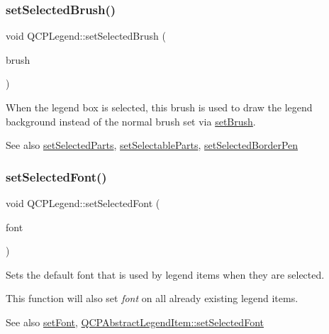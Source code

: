\subsubsection{\texorpdfstring{setSelectedBrush()}{setSelectedBrush()}}
{\footnotesize\ttfamily void Q\+C\+P\+Legend\+::set\+Selected\+Brush (\begin{DoxyParamCaption}\item[{const Q\+Brush \&}]{brush }\end{DoxyParamCaption})}

When the legend box is selected, this brush is used to draw the legend background instead of the normal brush set via \mbox{\hyperlink{class_q_c_p_legend_a497bbcd38baa3598c08e2b3f48103f23}{set\+Brush}}.

\begin{DoxySeeAlso}{See also}
\mbox{\hyperlink{class_q_c_p_legend_a2aee309bb5c2a794b1987f3fc97f8ad8}{set\+Selected\+Parts}}, \mbox{\hyperlink{class_q_c_p_legend_a9ce60aa8bbd89f62ae4fa83ac6c60110}{set\+Selectable\+Parts}}, \mbox{\hyperlink{class_q_c_p_legend_a2c35d262953a25d96b6112653fbefc88}{set\+Selected\+Border\+Pen}} 
\end{DoxySeeAlso}
\mbox{\label{class_q_c_p_legend_ab580a01c3c0a239374ed66c29edf5ad2}} 
\subsubsection{\texorpdfstring{setSelectedFont()}{setSelectedFont()}}
{\footnotesize\ttfamily void Q\+C\+P\+Legend\+::set\+Selected\+Font (\begin{DoxyParamCaption}\item[{const Q\+Font \&}]{font }\end{DoxyParamCaption})}

Sets the default font that is used by legend items when they are selected.

This function will also set {\itshape font} on all already existing legend items.

\begin{DoxySeeAlso}{See also}
\mbox{\hyperlink{class_q_c_p_legend_aa4cda8499e3cb0f3be415edc02984c73}{set\+Font}}, \mbox{\hyperlink{class_q_c_p_abstract_legend_item_a91db5aee48617a9d3206e61376807365}{Q\+C\+P\+Abstract\+Legend\+Item\+::set\+Selected\+Font}} 
\end{DoxySeeAlso}
\mbox{\label{class_q_c_p_legend_ade93aabe9bcccaf9cf46cec22c658027}} 
